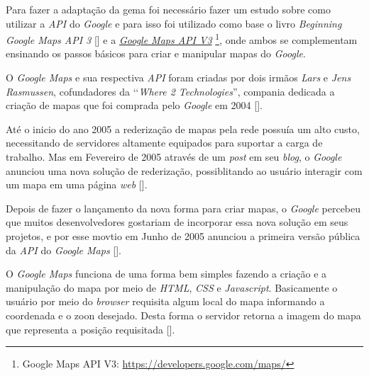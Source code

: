 Para fazer a adaptação da gema foi necessário fazer um estudo sobre como utilizar a \emph{API} do 
\emph{Google} e para isso foi utilizado como base o livro \emph{Beginning Google Maps API 3} 
[] e a 
\emph{\href{https://developers.google.com/maps/}{Google Maps API V3}} 
\footnote{Google Maps API V3: \url{https://developers.google.com/maps/}}, onde ambos se complementam 
ensinando os passos básicos para criar e manipular mapas do \emph{Google}. 

O \emph{Google Maps} e sua respectiva \emph{API} foram criadas por dois irmãos \emph{Lars} e 
\emph{Jens Rasmussen}, cofundadores da ‘‘\emph{Where 2 Technologies}'', compania dedicada a criação de mapas
que foi comprada pelo \emph{Google} em 2004 [].

Até o inicio do ano 2005 a rederização de mapas pela rede possuía um alto custo, necessitando de 
servidores altamente equipados para suportar a carga de trabalho. Mas em Fevereiro de 2005 através 
de um \emph{post} em seu \emph{blog}, o \emph{Google} anunciou uma nova solução de rederização, 
possiblitando ao usuário interagir com um mapa em uma página \emph{web}
[].

Depois de fazer o lançamento da nova forma para criar mapas, o \emph{Google} percebeu que 
muitos desenvolvedores gostariam de incorporar essa nova solução em seus projetos, e por esse 
movtio em Junho de 2005 anunciou a primeira versão pública da \emph{API} do \emph{Google Maps}
[].

O \emph{Google Maps} funciona de uma forma bem simples fazendo a criação e a manipulação do mapa
por meio de \emph{HTML}, \emph{CSS} e \emph{Javascript}. Basicamente o usuário por meio do \emph{browser}
requisita algum local do mapa informando a coordenada e o zoon desejado. Desta forma o servidor retorna a 
imagem do mapa que representa a posição requisitada []. 